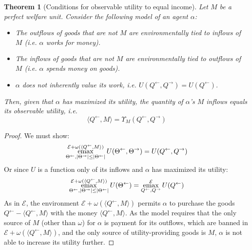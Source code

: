 \documentclass{journal}
\theoremstyle{plain}
\newtheorem{thm}{Theorem}
\theoremstyle{definition}
\newcommand{\economy}{\ensuremath{\mathcal{E}}}
\newcommand{\emax}{\ensuremath{\operatornamewithlimits{emax}}}
\begin{document}
\begin{thm}[Conditions for observable utility to equal income]
    \label{thm:gdp}
    Let $M$ be a perfect welfare unit. Consider the following model of an agent $\alpha$:
    \begin{itemize}
        \item The outflows of goods that are \emph{not} $M$ are environmentally tied to inflows of $M$ (i.e. $\alpha$ works for money).
        \item The inflows of goods that are not $M$ are environmentally tied to outflows of $M$ (i.e. $\alpha$ spends money on goods).
        \item $\alpha$ does not inherently value its work, i.e. $U(Q^\leftarrow, Q^\rightarrow)=U(Q^\leftarrow)$. 
    \end{itemize}
    Then, given that $\alpha$ has maximized its utility, the quantity of $\alpha$'s $M$ inflows equals its observable utility, i.e.
    \begin{equation}
        \label{eq:gdp}
        \langle Q^\leftarrow, M \rangle = \Upsilon_M(Q^\leftarrow, Q^\rightarrow)
    \end{equation}
\end{thm}
\begin{proof}
    We must show:
    \begin{equation*}
        \emax\limits_{\Theta^\leftarrow,|\Theta^\rightarrow|\le|\Theta^\leftarrow|}^{\economy + \omega\left(\langle Q^\leftarrow, M\rangle\right)} U(\Theta^\leftarrow, \Theta^\rightarrow) = U(Q^\leftarrow, Q^\rightarrow)
    \end{equation*}
    Or since $U$ is a function only of its inflows and $\alpha$ has maximized its utility:
    \begin{equation*}
        \emax\limits_{\Theta^\leftarrow,|\Theta^\rightarrow|\le|\Theta^\leftarrow|}^{\economy + \omega\left(\langle Q^\leftarrow, M\rangle\right)} U(\Theta^\leftarrow) = \emax_{Q^\leftarrow,Q^\rightarrow}^\economy U(Q^\leftarrow)
    \end{equation*}
    As in $\economy$, the environment $\economy+\omega(\langle Q^\leftarrow, M\rangle)$ permits $\alpha$ to purchase the goods $Q^\leftarrow - \langle Q^\leftarrow, M\rangle$ with the money $\langle Q^\leftarrow, M\rangle$. As the model requires that the only source of $M$ (other than $\omega$) for $\alpha$ is payment for its outflows, which are banned in $\economy+\omega(\langle Q^\leftarrow, M\rangle)$, and the only source of utility-providing goods is $M$, $\alpha$ is not able to increase its utility further.
\end{proof}
\end{document}
